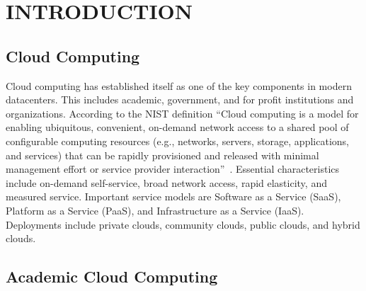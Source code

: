 \documentclass{sig-alternate-05-2015}
\begin{document}

\printccsdesc



\section{INTRODUCTION}

\subsection{Cloud Computing}

Cloud computing has established itself as one of the key components in modern datacenters. This includes academic, government, and for profit institutions and organizations.  According to the NIST definition ``Cloud computing is a model for enabling ubiquitous, convenient, on-demand network access to a shared pool of configurable computing resources (e.g., networks, servers, storage, applications, and services) that can be rapidly provisioned and released with minimal management effort or service provider interaction''~\cite{mell2011nist}. Essential characteristics include on-demand self-service, broad network access, rapid elasticity, and measured service. Important service models are Software as a Service (SaaS), Platform as a Service (PaaS), and Infrastructure as a Service (IaaS). Deployments include private clouds, community clouds, public clouds, and hybrid clouds.

\subsection{Academic Cloud Computing}
\label{S:academiccc}
\end{document}
